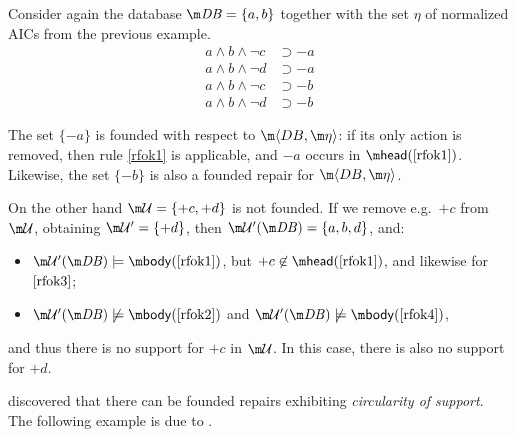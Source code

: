 \begin{example}
  Consider again the database $\db=\{a,b\}$ together with the set $\eta$ of normalized AICs from the previous example.
  \begin{align}
    a\land b\land\neg c &\supset{-a} \label{rfok1} \\
    a\land b\land\neg d &\supset{-a} \label{rfok2} \\
    a\land b\land\neg c &\supset{-b} \label{rfok3} \\
    a\land b\land\neg d &\supset{-b} \label{rfok4}
  \end{align}

  The set $\{{-a}\}$ is founded with respect to $\fulldb$: if its only action is removed, then rule \ref{rfok1} is applicable, and ${-a}$ occurs in $\head(\ref{rfok1})$.
  Likewise, the set $\{{-b}\}$ is also a founded repair for $\fulldb$.

  On the other hand $\UU=\{{+c},{+d}\}$ is not founded.
  If we remove e.g.~${+c}$ from $\UU$, obtaining $\UU'=\{+d\}$, then $\UU'(\db)=\{a,b,d\}$, and:
  \begin{itemize}
  \item $\UU'(\db)\models\body(\ref{rfok1})$, but ${+c}\not\in\head(\ref{rfok1})$, and likewise for $\ref{rfok3}$;
  \item $\UU'(\db)\not\models\body(\ref{rfok2})$ and $\UU'(\db)\not\models\body(\ref{rfok4})$,
  \end{itemize}
  and thus there is no support for ${+c}$ in $\UU$.
  In this case, there is also no support for ${+d}$.
\end{example}

\citet{tplp/CaropreseT11} discovered that there can be founded repairs exhibiting \emph{circularity of support}.
The following example is due to \citet{tase/Cruz-FilipeGEN13}.

